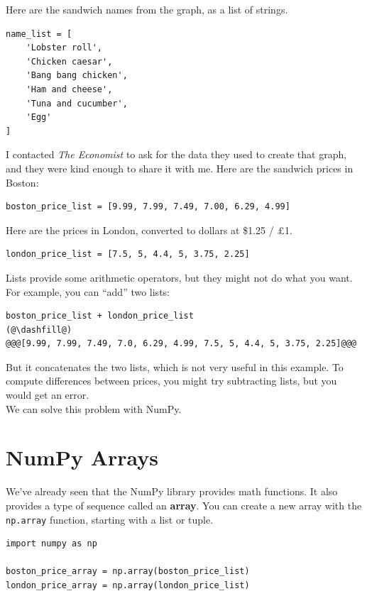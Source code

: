 Here are the sandwich names from the graph, as a list of strings.

\begin{lstlisting}[]
name_list = [
    'Lobster roll',
    'Chicken caesar',
    'Bang bang chicken',
    'Ham and cheese',
    'Tuna and cucumber',
    'Egg'
]
\end{lstlisting}

I contacted \emph{The Economist} to ask for the data they used to create
that graph, and they were kind enough to share it with me. Here are the
sandwich prices in Boston:

\begin{lstlisting}[]
boston_price_list = [9.99, 7.99, 7.49, 7.00, 6.29, 4.99]
\end{lstlisting}

Here are the prices in London, converted to dollars at \$1.25 / £1.

\begin{lstlisting}[]
london_price_list = [7.5, 5, 4.4, 5, 3.75, 2.25]
\end{lstlisting}

Lists provide some arithmetic operators, but they might not do what you
want. For example, you can ``add'' two lists:

\begin{lstlisting}[]
boston_price_list + london_price_list
(@\dashfill@)
@@@[9.99, 7.99, 7.49, 7.0, 6.29, 4.99, 7.5, 5, 4.4, 5, 3.75, 2.25]@@@
\end{lstlisting}

But it concatenates the two lists, which is not very useful in this
example. To compute differences between prices, you might try
subtracting lists, but you would get an error.\\
We can solve this problem with NumPy.

\hypertarget{numpy-arrays}{%
\section{NumPy Arrays}\label{numpy-arrays}}

We've already seen that the NumPy library provides math functions. It
also provides a type of sequence called an \textbf{array}. You can
create a new array with the \passthrough{\lstinline!np.array!} function,
starting with a list or tuple.

\begin{lstlisting}[]
import numpy as np

boston_price_array = np.array(boston_price_list)
london_price_array = np.array(london_price_list)
\end{lstlisting}

